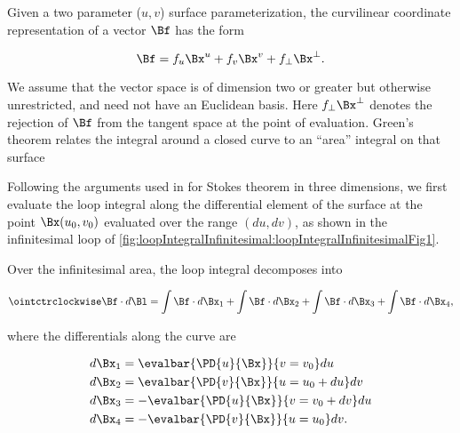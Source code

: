 %
%
Given a two parameter (\(u,v\)) surface parameterization, the curvilinear coordinate representation of a vector \(\Bf\) has the form

\begin{dmath}\label{eqn:stokesTheoremGeometricAlgebra:1640}
\Bf = f_u \Bx^u + f_v \Bx^v + f_\perp \Bx^\perp.
\end{dmath}

We assume that the vector space is of dimension two or greater but otherwise unrestricted, and need not have an Euclidean basis.  Here \(f_\perp \Bx^\perp\) denotes the rejection of \(\Bf\) from the tangent space at the point of evaluation.  Green's theorem relates the integral around a closed curve to an ``area'' integral on that surface


Following the arguments used in \citep{schwartz1987pe} for Stokes theorem in three dimensions, we first evaluate the loop integral along the differential element of the surface at the point \(\Bx(u_0, v_0)\) evaluated over the range \((du, dv)\), as shown in the infinitesimal loop of \cref{fig:loopIntegralInfinitesimal:loopIntegralInfinitesimalFig1}.


Over the infinitesimal area, the loop integral decomposes into

\begin{dmath}\label{eqn:stokesTheoremGeometricAlgebra:1700}
\ointctrclockwise \Bf \cdot d\Bl
=
\int \Bf \cdot d\Bx_1
+\int \Bf \cdot d\Bx_2
+\int \Bf \cdot d\Bx_3
+\int \Bf \cdot d\Bx_4,
\end{dmath}

where the differentials along the curve are

\begin{dmath}\label{eqn:stokesTheoremGeometricAlgebra:1600}
\begin{aligned}
d\Bx_1 &= \evalbar{ \PD{u}{\Bx} }{v = v_0} du \\
d\Bx_2 &= \evalbar{ \PD{v}{\Bx} }{u = u_0 + du} dv \\
d\Bx_3 &= -\evalbar{ \PD{u}{\Bx} }{v = v_0 + dv} du \\
d\Bx_4 &= -\evalbar{ \PD{v}{\Bx} }{u = u_0} dv.
\end{aligned}
\end{dmath}

